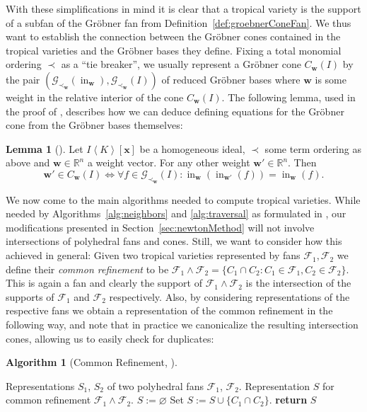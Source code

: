 \documentclass[
  paper=a4,
  titlepage,
  bibliography=totoc,
  pagesize=pdftex
]{scrartcl}
\numberwithin{figure}{section}
\numberwithin{equation}{section}
\numberwithin{table}{section}
\newcommand*\setR{\mathds{R}}
\newcommand*\ideal[1]{\left\langle #1 \right\rangle}
\let\vec\mathbf
\DeclareMathOperator{\initial}{in}
\theoremstyle{definition}
\newtheorem{lemma}[definition]{Lemma}
\newtheorem{algo}[definition]{Algorithm}
\numberwithin{definition}{section}
\begin{document}
With these simplifications in mind it is clear that a tropical variety is the support of a
subfan of the Gröbner fan from Definition~\ref{def:groebnerConeFan}. We thus want to
establish the connection between the Gröbner cones contained in the tropical varieties and
the Gröbner bases they define. Fixing a total monomial ordering $\prec$ as a \enquote{tie
breaker}, we usually represent a Gröbner cone $C_{\vec w}(I)$ by the pair $(\mathcal
G_{\prec_{\vec w}}(\initial_{\vec w}), \mathcal G_{\prec_{\vec w}}(I))$ of reduced Gröbner
bases where $\vec w$ is some weight in the relative interior of the cone $C_{\vec w}(I)$.
The following lemma, used in the proof of \cite[Proposition~2.3]{SturmGBCP}, describes how
we can deduce defining equations for the Gröbner cone from the Gröbner bases themselves:

\begin{lemma}[{\cite[Lemma~4.2]{compTropVar}}]
  \label{lem:grConEq}
  Let $I \ideal K[\vec x]$ be a homogeneous ideal, $\prec$ some term ordering as above and
  $\vec w \in \setR^n$ a weight vector. For any other weight $\vec w' \in \setR^n$. Then
  \[
    \vec w' \in C_{\vec w}(I) \iff
    \forall f \in \mathcal G_{\prec_{\vec w}}(I) :
    \initial_{\vec w}(\initial_{\vec w'}(f)) = \initial_{\vec w}(f).
  \]
\end{lemma}

We now come to the main algorithms needed to compute tropical varieties. While needed by
Algorithms~\ref{alg:neighbors} and \ref{alg:traversal} as formulated in
\cite{compTropVar}, our modifications presented in Section~\ref{sec:newtonMethod} will not
involve intersections of polyhedral fans and cones. Still, we want to consider how this
achieved in general: Given two tropical varieties represented by fans $\mathcal F_1,
\mathcal F_2$ we define their \emph{common refinement} to be $\mathcal F_1 \wedge \mathcal
F_2 = \{ C_1 \cap C_2 : C_1 \in \mathcal F_1, C_2 \in \mathcal F_2 \}$. This is again a
fan and clearly the support of $\mathcal F_1 \wedge \mathcal F_2$ is the intersection of
the supports of $\mathcal F_1$ and $\mathcal F_2$ respectively. Also, by considering
representations of the respective fans we obtain a representation of the common refinement
in the following way, and note that in practice we canonicalize the resulting intersection
cones, allowing us to easily check for duplicates:

\begin{algo}[Common Refinement, {\cite[Algorithm~4.4]{compTropVar}}]\
  \label{alg:fanRefinement}
  \begin{algorithmic}[1]
    \Require Representations $S_1$, $S_2$ of two polyhedral fans $\mathcal
      F_1$, $\mathcal F_2$.
    \Ensure Representation $S$ for common refinement $\mathcal F_1 \wedge \mathcal F_2$.
    \State $S := \varnothing$
      \State Set $S := S \cup \{ C_1 \cap C_2 \}$.
    \EndFor
    \State\textbf{return} $S$
  \end{algorithmic}
\end{algo}
\end{document}
